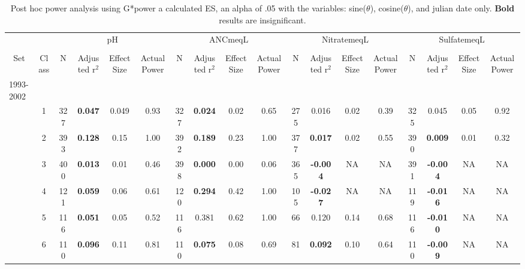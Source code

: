 \begin{sidewaystable}[p]\footnotesize
\caption{Post hoc power analysis using G*power a calculated ES, an alpha of .05 with the variables: sine($\theta$), cosine($\theta$), and julian date only.   \textbf{Bold} results are insignificant.}
\begin{tabular}{p{1cm}p{.5cm}cccccccccccccccc}
\hline\noalign{\smallskip}
\multicolumn{1}{c}{}&\multicolumn{1}{c}{}  & \multicolumn{4}{c}{pH} &\multicolumn{4}{c}{ ANCmeqL} & \multicolumn{4}{c}{ NitratemeqL} &  \multicolumn{4}{c}{SulfatemeqL}  \\ \cline{3-18}\noalign{\smallskip}
 & \multicolumn{ 1}{c}{} & \multicolumn{ 1}{c}{} &  \\ 
 \multicolumn{ 1}{c}{Set} & \multicolumn{ 1}{c}{Class} & \multicolumn{ 1}{c}{N} & \multicolumn{ 1}{p{1.2cm}}{Adjusted r$^2$} & \multicolumn{ 1}{p{1cm}}{Effect Size} & \multicolumn{ 1}{p{1cm}}{Actual Power} & \multicolumn{ 1}{c}{N} & \multicolumn{ 1}{p{1.2cm}}{Adjusted r$^2$} & \multicolumn{ 1}{p{1cm}}{Effect Size} & \multicolumn{ 1}{p{1cm}}{Actual Power} & \multicolumn{ 1}{c}{N} & \multicolumn{ 1}{p{1.2cm}}{Adjusted r$^2$} & \multicolumn{ 1}{p{1cm}}{Effect Size} & \multicolumn{ 1}{p{1cm}}{Actual Power} & \multicolumn{ 1}{c}{N} & \multicolumn{ 1}{p{1.2cm}}{Adjusted r$^2$} & \multicolumn{ 1}{p{1cm}}{Effect Size}& \multicolumn{1}{p{1cm}}{Actual Power} \\ \hline\noalign{\smallskip}
1993-2002\\
& \multicolumn{1}{c}{1} & 327 & \textbf{0.047} & 0.049 & 0.93 & 327 & \textbf{0.024} & 0.02 & 0.65 & 275 & 0.016 & 0.02 & 0.39 & 325 & 0.045 & 0.05 & 0.92 \\ 
 & \multicolumn{ 1}{c}{2} & 393 & \textbf{0.128 } & 0.15  & 1.00  & 392 & \textbf{0.189 } & 0.23  & 1.00  & 377 & \textbf{0.017 } & 0.02  & 0.55  & 390 & \textbf{0.009 } & 0.01  & 0.32  \\ 
 & \multicolumn{ 1}{c}{3} & 400 & \textbf{0.013 } & 0.01  & 0.46  & 398 & \textbf{0.000 } & 0.00  & 0.06  & 365 & \textbf{-0.004 } & NA & NA & 391 & \textbf{-0.004 } &  NA & NA \\ 
 & \multicolumn{ 1}{c}{4} & 121 & \textbf{0.059 } & 0.06  & 0.61  & 120 & \textbf{0.294 } & 0.42  & 1.00  & 105 & \textbf{-0.027 } & NA & NA & 119 & \textbf{-0.016 } & NA & NA \\ 
 & \multicolumn{ 1}{c}{5} & 116 & \textbf{0.051 } & 0.05  & 0.52  & 116 & 0.381  & 0.62  & 1.00  & 66 & 0.120  & 0.14  & 0.68  & 116 & \textbf{-0.010 } & NA & NA \\ 
 & \multicolumn{ 1}{c}{6} & 110 & \textbf{0.096 } & 0.11  & 0.81  & 110 & \textbf{0.075 } & 0.08  & 0.69  & 81 & \textbf{0.092 } & 0.10  & 0.64  & 110 & \textbf{-0.009 } & NA & NA \\ 

\end{tabular}
\end{sidewaystable}

